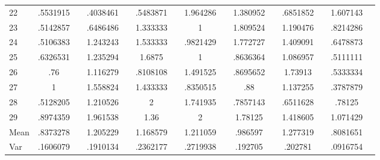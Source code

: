 \documentclass[a4paper,12pt]{article}
\begin{document}
\begin{landscape}
\begin{footnotesize}
\begin{center}
\begin{longtable}{l|cc|cc|cc|cc|cc|cc|cc|}
22&.5531915&&.4038461&&.5483871&&1.964286&&1.380952&&.6851852&&1.607143& \\
23&.5142857&&.6486486&&1.333333&&1&&1.809524&&1.190476&&.8214286& \\
24&.5106383&&1.243243&&1.533333&&.9821429&&1.772727&&1.409091&&.6478873& \\
25&.6326531&&1.235294&&1.6875&&1&&.8636364&&1.086957&&.5111111& \\
26&.76&&1.116279&&.8108108&&1.491525&&.8695652&&1.73913&&.5333334& \\
27&1&&1.558824&&1.433333&&.8350515&&.88&&1.137255&&.3787879& \\
28&.5128205&&1.210526&&2&&1.741935&&.7857143&&.6511628&&.78125& \\
29&.8974359&&1.961538&&1.36&&2&&1.78125&&1.418605&&1.071429& \\ \hline
Mean&.8373278&&1.205229&&1.168579&&1.211059&&.986597&&1.277319&&.8081651& \\
Var&.1606079&&.1910134&&.2362177&&.2719938&&.192705&&.202781&&.0916754& \\ \hline
\end{longtable}
\end{center}
\end{footnotesize}
\end{landscape}
\end{document}

